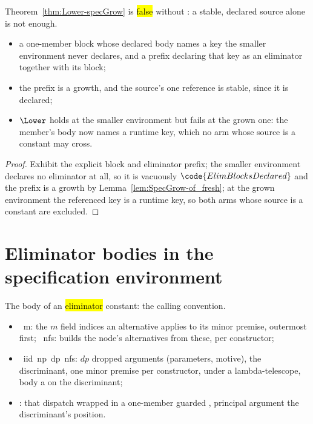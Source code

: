 \begin{lemma}
\label{lem:SpecGrowFixture-specGrow_needs_declaredEnv}
\leanok
{}
 Theorem~\ref{thm:Lower-specGrow} is \hl{false} without : a
stable, declared source alone is not enough.
\begin{itemize}
\item {} a one-member block whose declared body names a key the smaller environment never
declares, and a prefix declaring that key as an eliminator together with its block;
\item the prefix is a growth, and the source's one reference is stable, since it is declared;
\item {} $\Lower$ holds at the smaller environment but fails at the grown one: the member's
body now names a runtime key, which no arm whose source is a constant may cross.
\end{itemize}
\end{lemma}
\begin{proof}
\leanok
{}
 Exhibit the explicit block and eliminator prefix; the smaller environment declares no
eliminator at all, so it is vacuously $\code{ElimBlocksDeclared}$ and the prefix is a growth by
Lemma~\ref{lem:SpecGrow-of_fresh}; at the grown environment the referenced key is a runtime key, so both
arms whose source is a constant are excluded.
\end{proof}

\section{Eliminator bodies in the specification environment}
\label{sec:lowering:elimbody}

\begin{definition}
\label{def:mkElimBody}
\leanok
{}
 The \lbox{} body of an \hl{eliminator} constant: the  calling
convention.
\begin{itemize}
\item {}\ m: the $m$ field indices an alternative applies to its minor premise, outermost
first; \ nfs: builds the  node's alternatives from these, per constructor;
\item {}\ iid\ np\ dp\ nfs: $dp$ dropped arguments (parameters, motive), the
discriminant, one minor premise per constructor, under a lambda-telescope, body a  on the
discriminant;
\item {}: that dispatch wrapped in a one-member guarded , principal argument
the discriminant's position.
\end{itemize}
\end{definition}

